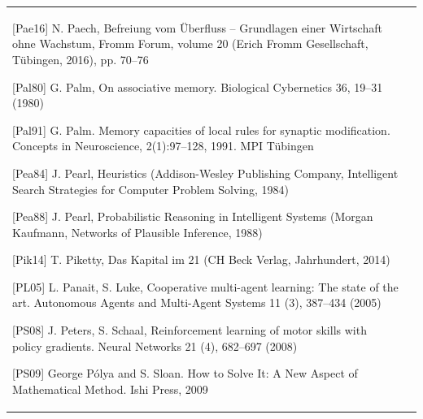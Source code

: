 \documentclass[10pt]{book}
\begin{document}
\begin{center}
\begin{tabular}{|l|l|}
[Pae16] N. Paech, Befreiung vom \"Uberfluss -- Grundlagen einer Wirtschaft ohne Wachstum, Fromm Forum, volume 20 (Erich Fromm Gesellschaft, T\"ubingen, 2016), pp. 70--76

[Pal80] G. Palm, On associative memory. Biological Cybernetics 36, 19--31 (1980)

[Pal91] G. Palm. Memory capacities of local rules for synaptic modification. Concepts in Neuroscience, 2(1):97--128, 1991. MPI T\"ubingen

[Pea84] J. Pearl, Heuristics (Addison-Wesley Publishing Company, Intelligent Search Strategies for Computer Problem Solving, 1984)

[Pea88] J. Pearl, Probabilistic Reasoning in Intelligent Systems (Morgan Kaufmann, Networks of Plausible Inference, 1988)

[Pik14] T. Piketty, Das Kapital im 21 (CH Beck Verlag, Jahrhundert, 2014)

[PL05] L. Panait, S. Luke, Cooperative multi-agent learning: The state of the art. Autonomous Agents and Multi-Agent Systems 11 (3), 387--434 (2005)

[PS08] J. Peters, S. Schaal, Reinforcement learning of motor skills with policy gradients. Neural Networks 21 (4), 682--697 (2008)

[PS09] George P\'olya and S. Sloan. How to Solve It: A New Aspect of Mathematical Method. Ishi Press, 2009


\end{tabular}
\end{center}
\end{document}
